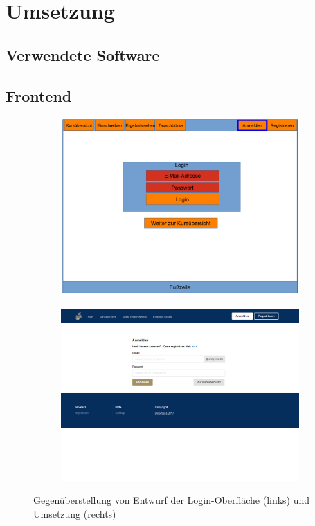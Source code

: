 \chapter{Umsetzung}
\label{chapter:implementation}
    \section{Verwendete Software}
        
    
    \section{Frontend}
        
        \begin{figure}
            \centering
            \begin{subfigure}{0.49\textwidth}
                \includegraphics[width=1.0\textwidth]{./implementation/images/MockUpsFrontend/frontendLogin.png}
            \end{subfigure}
            \begin{subfigure}{0.49\textwidth}
                \includegraphics[width=1.0\textwidth]{./implementation/images/login.png}
            \end{subfigure}
            \caption{Gegenüberstellung von Entwurf der Login-Oberfläche (links) und Umsetzung (rechts)}
            \label{fig:comparisonLogin}
        \end{figure}
    
